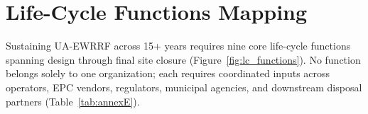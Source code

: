 \section{Life-Cycle Functions Mapping}
\label{sec:E}

Sustaining UA-EWRRF across 15+ years requires nine core life-cycle functions spanning design through final site closure (Figure~\ref{fig:lc_functions}). No function belongs solely to one organization; each requires coordinated inputs across operators, EPC vendors, regulators, municipal agencies, and downstream disposal partners (Table~\ref{tab:annexE}).



